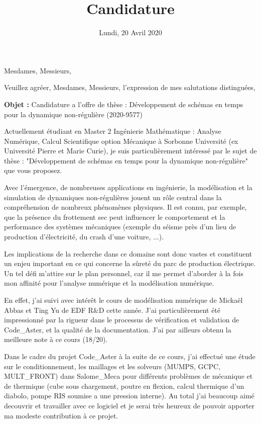 \documentclass[11pt,a4paper,sans]{moderncv}        %
\title{Candidature}                               %
\begin{document}
\date{Lundi, 20 Avril 2020}
\opening{Mesdames, Messieurs,}
\closing{Veuillez agréer, Mesdames, Messieurs, l’expression de mes salutations distinguées,}
\makelettertitle

\textbf{Objet :} Candidature a l'offre de thèse : Développement de schémas en temps pour la dynamique non-régulière (2020-9577)



Actuellement étudiant en Master 2 Ingénierie Mathématique : Analyse Numérique, Calcul Scientifique option Mécanique à Sorbonne Université (ex Université Pierre et Marie Curie), je suis particulièrement intéressé par le sujet de thèse : "Développement de schémas en temps pour la dynamique non-régulière" que vous proposez.

Avec l'émergence, de nombreuses applications en ingénierie, la modélisation et la simulation de dynamiques non-régulières jouent un rôle central dans la compréhension de nombreux phénomènes physiques. Il est connu, par exemple, que la présence du frottement sec peut influencer le comportement et la performance des systèmes mécaniques (exemple du séisme près d'un lieu de production d'électricité, du crash d'une voiture, ...).

Les implications de la recherche dans ce domaine sont donc vastes et constituent un enjeu important en ce qui concerne la sûreté du parc de production électrique. Un tel défi m'attire sur le plan personnel, car il me permet d'aborder à la fois mon affinité pour l'analyse numérique et la modélisation numérique.

En effet, j'ai suivi avec intérêt le cours de modélisation numérique de Mickaël Abbas et Ting Yu de EDF R\&D cette année. J'ai particulièrement été impressionné par la rigueur dans le processus de vérification et validation de Code\_Aster, et la qualité de la documentation. J'ai par ailleurs obtenu la meilleure note à ce cours (18/20).

Dans le cadre du projet Code\_Aster à la suite de ce cours, j'ai effectué une étude sur le conditionnement, les maillages et les solveurs (MUMPS, GCPC, MULT\_FRONT) dans Salome\_Meca pour différents problèmes de mécanique et de thermique (cube sous chargement, poutre en flexion, calcul thermique d'un diabolo, pompe RIS soumise a une pression interne).
Au total j'ai beaucoup aimé decouvrir et travailler avec ce logiciel et je serai très heureux de pouvoir apporter ma modeste contribution à ce projet.
\end{document}
